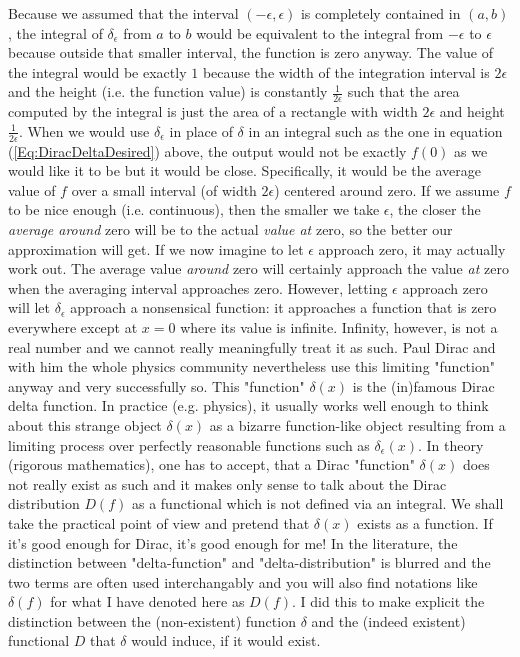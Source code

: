 Because we assumed that the interval $(-\epsilon, \epsilon)$ is completely contained in $(a,b)$, the integral of $\delta_{\epsilon}$ from $a$ to $b$ would be equivalent to the integral from $-\epsilon$ to $\epsilon$ because outside that smaller interval, the function is zero anyway. The value of the integral would be exactly $1$ because the width of the integration interval is $2 \epsilon$ and the height (i.e. the function value) is constantly $\frac{1}{2 \epsilon}$ such that the area computed by the integral is just the area of a rectangle with width $2 \epsilon$ and height $\frac{1}{2 \epsilon}$. When we would use $\delta_{\epsilon}$ in place of $\delta$ in an integral such as the one in equation (\ref{Eq:DiracDeltaDesired}) above, the output would not be exactly $f(0)$ as we would like it to be but it would be close. Specifically, it would be the average value of $f$ over a small interval (of width $2 \epsilon$) centered around zero. If we assume $f$ to be nice enough (i.e. continuous), then the smaller we take $\epsilon$, the closer the \emph{average around} zero will be to the actual \emph{value at} zero, so the better our approximation will get. If we now imagine to let $\epsilon$ approach zero, it may actually work out. The average value \emph{around} zero will certainly approach the value \emph{at} zero when the averaging interval approaches zero. However, letting  $\epsilon$ approach zero will let $\delta_{\epsilon}$ approach a nonsensical function: it approaches a function that is zero everywhere except at $x=0$ where its value is infinite. Infinity, however, is not a real number and we cannot really meaningfully treat it as such. Paul Dirac and with him the whole physics community nevertheless use this limiting "function" anyway and very successfully so. This "function" $\delta(x)$ is the (in)famous Dirac delta function. In practice (e.g. physics), it usually works well enough to think about this strange object $\delta(x)$ as a bizarre function-like object resulting from a limiting process over perfectly reasonable functions such as $\delta_{\epsilon}(x)$. In theory (rigorous mathematics), one has to accept, that a Dirac "function"  $\delta(x)$ does not really exist as such and it makes only sense to talk about the Dirac distribution $D(f)$ as a functional which is not defined via an integral. We shall take the practical point of view and pretend that $\delta(x)$ exists as a function. If it's good enough for Dirac, it's good enough for me! In the literature, the distinction between "delta-function" and "delta-distribution" is blurred and the two terms are often used interchangably and you will also find notations like $\delta(f)$ for what I have denoted here as $D(f)$. I did this to make explicit the distinction between the (non-existent) function $\delta$ and the (indeed existent) functional $D$ that $\delta$ would induce, if it would exist.

